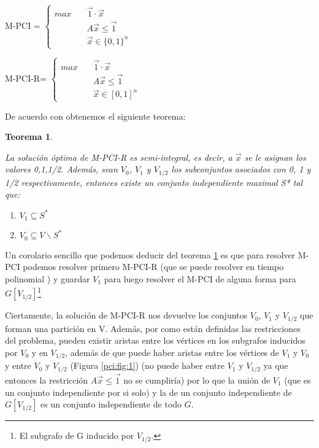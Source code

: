 \documentclass[a4paper,12pt,titlepage]{article}
\newtheorem{teo}{Teorema}[section]
\begin{document}
\begin{minipage}{.5\textwidth}
M-PCI =
$
\left\{\begin{aligned}
max \quad & \overrightarrow{1}\cdot\overrightarrow{x} \\
    & A\overrightarrow{x}\leq \overrightarrow{1} \label{pci:1}\\
    & \overrightarrow{x} \in \{0,1\}^n
\end{aligned}\right.
$
\end{minipage}
\begin{minipage}{.5\textwidth}

M-PCI-R=
$
\left\{\begin{aligned}
max \quad & \overrightarrow{1}\cdot\overrightarrow{x} \\
    & A\overrightarrow{x}\leq \overrightarrow{1} \\
    & \overrightarrow{x} \in [0,1]^n
\end{aligned}\right.
$
\end{minipage}

\vspace{\baselineskip}

De acuerdo con \cite{max-pci1} obtenemos el siguiente teorema:

\begin{teo} 
\label{pci:teo:1}

La soluci\'on \'optima de M-PCI-R es semi-integral, es decir, a $\overrightarrow{x}$ se le asignan los valores {0,1,1/2}. Adem\'as, sean $V_0$, $V_1$ y $V_{1/2}$ los subconjuntos asociados con 0, 1 y 1/2 respectivamente, entonces existe un conjunto independiente maximal S* tal que:

\begin{enumerate}
\item $V_1 \subseteq S^*$
\item $V_0 \subseteq V{\backslash}S^*$
\end{enumerate}

\end{teo}

Un corolario sencillo que podemos deducir del teorema \ref{pci:teo:1} es que para resolver M-PCI podemos resolver primero M-PCI-R (que se puede resolver en tiempo polinomial \cite{max-pci2}) y guardar $V_1$ para luego resolver el M-PCI de alguna forma para $G[V_{1/2}]$\footnote{El subgrafo de G inducido por $V_{1/2}$.}

Ciertamente, la soluci\'on de M-PCI-R nos devuelve los conjuntos $V_0$, $V_1$ y $V_{1/2}$ que forman una partici\'on en V. Adem\'as, por como est\'an definidas las restricciones del problema, pueden existir aristas entre los v\'ertices en los subgrafos inducidos por $V_0$ y en $V_{1/2}$, adem\'as de que puede haber aristas entre los v\'ertices de $V_1$ y $V_0$ y entre $V_0$ y $V_{1/2}$ (Figura \ref{pci:fig:1}) (no puede haber entre $V_1$ y $V_{1/2}$ ya que entonces la restricci\'on $A\overrightarrow{x} \leq \overrightarrow{1}$ no se cumplir\'ia) por lo que la uni\'on de $V_1$ (que es un conjunto independiente por si solo) y la de un conjunto independiente de $G[V_{1/2}]$ es un conjunto independiente de todo $G$.
\end{document}
